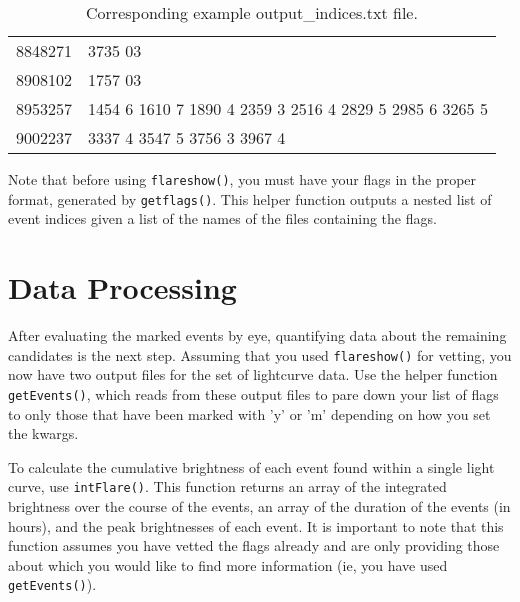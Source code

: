 \documentclass{article}
\begin{document}
\begin{table}[h]
  \centering
  \begin{tabular}{l l}

8848271 &  3735 03 \\
8908102 &  1757 03 \\
8953257 &  1454  6 1610  7 1890  4 2359  3 2516  4 2829  5 2985  6
3265  5 \\
9002237 &  3337  4 3547  5 3756  3 3967  4 \\
\end{tabular}
\caption{Corresponding example output\_indices.txt file.}
\end{table}

Note that before using \verb|flareshow()|, you must have your flags in
the proper format, generated by \verb|getflags()|.  This helper
function outputs a nested list of event indices given a list of the
names of the files containing the flags.

\section{Data Processing}
\label{sec:advanced}

After evaluating the marked events by eye, quantifying data about the
remaining candidates is the next step.  Assuming that you used
\verb|flareshow()| for vetting, you now have two output files for the
set of lightcurve data.  Use the helper function \verb|getEvents()|,
which reads from these output files to pare down your list of flags to
only those that have been marked with 'y' or 'm' depending on how you
set the kwargs.

To calculate the cumulative brightness of each event found within a
single light curve, use \verb|intFlare()|.  This function returns an
array of the integrated brightness over the course of the events, an
array of the duration of the events (in hours), and the peak
brightnesses of each event.  It is important to note that this
function assumes you have vetted the flags already and are only
providing those about which you would like to find more information
(ie, you have used \verb|getEvents()|).
\end{document}
